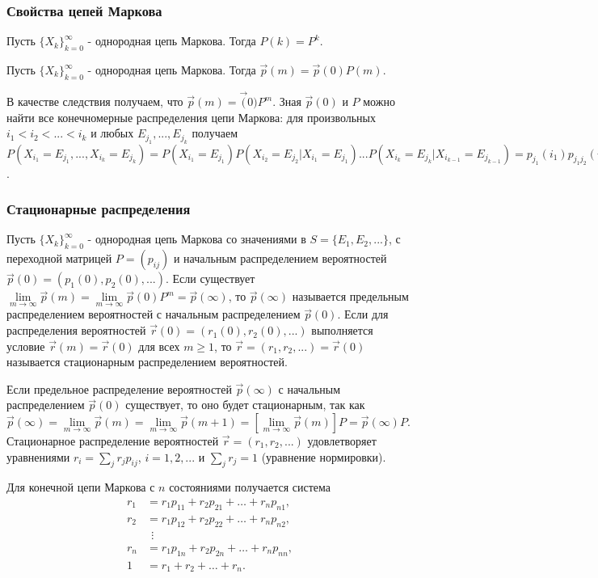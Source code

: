 \subsubsection*{Свойства цепей Маркова}

Пусть $\{X_k\}_{k=0}^\infty $ - однородная цепь Маркова. Тогда $P(k)=P^k$.

Пусть $\{X_k\}_{k=0}^\infty$ - однородная цепь Маркова. Тогда $\vec p(m)= \vec p (0) P(m)$.

В качестве следствия получаем, что $\vec p(m)=\vec (0)P^m$.
Зная $\vec p(0)$ и $P$ можно найти все конечномерные распределения цепи Маркова: для произвольных $i_1<i_2<...<i_k$ и любых $E_{j_1},...,E_{j_k}$ получаем $P(X_{i_1}=E_{j_1},...,X_{i_k}=E_{j_k}) = P(X_{i_1}=E_{j_1})P(X_{i_2}=E_{j_2}|X_{i_1}=E_{j_1})...P(X_{i_k}=E_{j_k}|X_{i_{k-1}}=E_{j_{k-1}}) = p_{j_1}(i_1)p_{j_1j_2}(i_2-i_1)...p_{j_{k-1}j_k}(i_k-i_{k-1})$.

\subsubsection*{Стационарные распределения}

Пусть $\{X_k\}_{k=0}^\infty$ - однородная цепь Маркова со значениями в $S=\{E_1,E_2,...\}$, с переходной матрицей $P=(p_{ij})$ и начальным распределением вероятностей $\vec p(0)=(p_1(0),p_2(0),...)$.
Если существует $\lim\limits_{m \to \infty} \vec{p}(m) = \lim\limits_{m \to \infty} \vec p (0) P^m = \vec p (\infty )$, то $\vec p (\infty)$ называется предельным распределением вероятностей с начальным распределением $\vec p (0)$.
Если для распределения вероятностей $\vec r (0) = (r_1(0),r_2(0),...)$ выполняется условие $\vec r (m)=\vec r(0)$ для всех $m \geq 1$, то $\vec r = (r_1,r_2,...)=\vec r(0)$ называется стационарным распределением вероятностей.

Если  предельное распределение вероятностей $\vec p (\infty)$ с начальным распределением $\vec p(0)$ существует, то оно будет стационарным, так как $\vec p(\infty)= \lim\limits_{m\to \infty } \vec p (m)= \lim\limits_{m \to \infty} \vec p (m+1) = [\lim\limits_{m \to \infty } \vec p (m)]P = \vec p (\infty ) P$.
Стационарное распределение вероятностей $\vec r = (r_1,r_2,...)$ удовлетворяет уравнениями $r_i=\sum_j r_j p_{ij}$, $i=1,2,...$ и $\sum_j r_j=1$ (уравнение нормировки).

Для конечной цепи Маркова с $n$ состояниями получается система
\[
	\begin{aligned}
		r_1 & = r_1 p_{11} + r_2 p_{21} + \dots + r_n p_{n1}, \\
		r_2 & = r_1 p_{12} + r_2 p_{22} + \dots + r_n p_{n2}, \\
		    & \ \ \vdots                                      \\
		r_n & = r_1 p_{1n} + r_2 p_{2n} + \dots + r_n p_{nn}, \\
		1   & = r_1 + r_2 + \dots + r_n.
	\end{aligned}
\]

